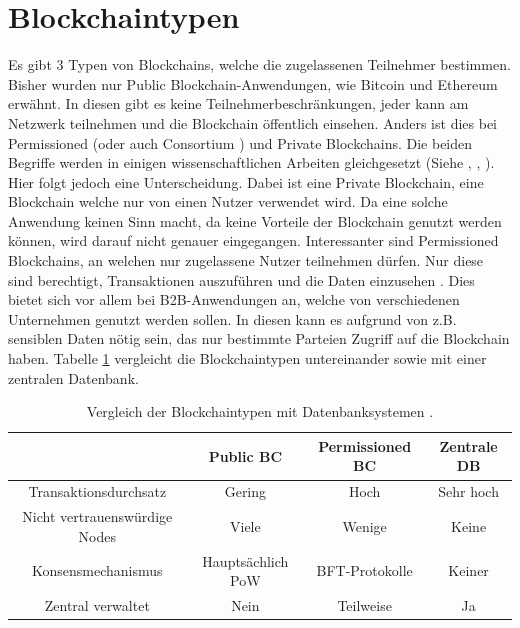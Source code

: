 \section{Blockchaintypen}
Es gibt 3 Typen von Blockchains, welche die zugelassenen Teilnehmer bestimmen. Bisher wurden nur Public Blockchain-Anwendungen, wie Bitcoin und Ethereum erwähnt. In diesen gibt es keine Teilnehmerbeschränkungen, jeder kann am Netzwerk teilnehmen und die Blockchain öffentlich einsehen. Anders ist dies bei Permissioned (oder auch Consortium \cite{BenHamidaBlockchainEnterpriseOverview2017}) und Private Blockchains. Die beiden Begriffe werden in einigen wissenschaftlichen Arbeiten gleichgesetzt (Siehe \cite{Gramolidangerprivateblockchains2016}, \cite{PongnumkulPerformanceAnalysisPrivate2017}, \cite{LiScalablePrivateIndustrial2017}). Hier folgt jedoch eine Unterscheidung. Dabei ist eine Private Blockchain, eine Blockchain welche nur von einen Nutzer verwendet wird. Da eine solche Anwendung keinen Sinn macht, da keine Vorteile der Blockchain genutzt werden können, wird darauf nicht genauer eingegangen. Interessanter sind Permissioned Blockchains, an welchen nur zugelassene Nutzer teilnehmen dürfen. Nur diese sind berechtigt, Transaktionen auszuführen und die Daten einzusehen \cite{LiScalablePrivateIndustrial2017}. Dies bietet sich vor allem bei B2B-Anwendungen an, welche von verschiedenen Unternehmen genutzt werden sollen. In diesen kann es aufgrund von z.B. sensiblen Daten nötig sein, das nur bestimmte Parteien Zugriff auf die Blockchain haben. Tabelle \ref{tab:bc-comparison} vergleicht die Blockchaintypen untereinander sowie mit einer zentralen Datenbank.

\begin{table}[h]
    \centering
	\begin{tabular}{c c c c}
	\textbf{} & \textbf{Public BC} & \textbf{Permissioned BC}  & \textbf{Zentrale DB} \\ \hline
	Transaktionsdurchsatz & Gering & Hoch & Sehr hoch \\ \hline
    Nicht vertrauenswürdige Nodes & Viele & Wenige & Keine \\ \hline
    Konsensmechanismus & Hauptsächlich PoW & BFT-Protokolle & Keiner \\ \hline
    Zentral verwaltet & Nein & Teilweise & Ja \\
    \end{tabular}
    \caption{Vergleich der Blockchaintypen mit Datenbanksystemen \cite{WustyouneedBlockchain2017}\cite{ZhengBlockchainChallengesOpportunities2017}.}
	\label{tab:bc-comparison}
\end{table}

